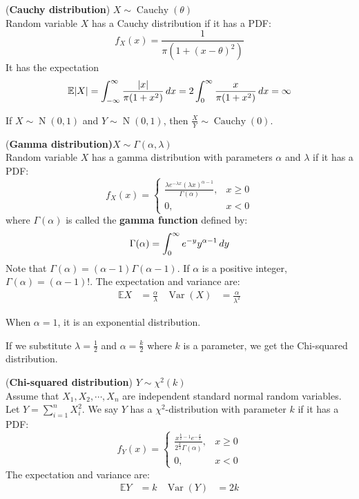 \documentclass{huhtakm-template-book}
\newcommand{\expect}{\mathbb{E}}
\DeclareMathOperator{\N}{N}
\DeclareMathOperator{\Cauchy}{Cauchy}
\DeclareMathOperator{\Var}{Var}
\begin{document}
\newpage
\begin{eg}(\textbf{Cauchy distribution}) $X\sim\Cauchy(\theta)$\\
	Random variable $X$ has a Cauchy distribution if it has a PDF:
	\begin{equation*}
		f_{X}(x)=\frac{1}{\pi(1+(x-\theta)^{2})}
	\end{equation*}
	It has the expectation
	\begin{equation*}
		\expect|X|=\intinfty\frac{|x|}{\pi(1+x^{2})}\,dx=2\intlu{0}{\infty}\frac{x}{\pi(1+x^{2})}\,dx=\infty
	\end{equation*}
\end{eg}
\begin{rem}
	If $X\sim\N(0,1)$ and $Y\sim\N(0,1)$, then $\frac{X}{Y}\sim\Cauchy(0)$.
\end{rem}
\begin{eg}(\textbf{Gamma distribution)}$X\sim\Gamma(\alpha,\lambda)$\\
	Random variable $X$ has a gamma distribution with parameters $\alpha$ and $\lambda$ if it has a PDF:
	\begin{equation*}
		f_{X}(x)=\begin{cases}
			\frac{\lambda e^{-\lambda x}(\lambda x)^{\alpha-1}}{\Gamma(\alpha)}, &x\geq 0\\
			0, &x<0
		\end{cases}
	\end{equation*}
	where $\Gamma(\alpha)$ is called the \textbf{gamma function} defined by:
	\begin{equation*}
		\Gamma(\alpha)=\int_{0}^{\infty}e^{-y}y^{\alpha-1}\,dy
	\end{equation*}
	Note that $\Gamma(\alpha)=(\alpha-1)\Gamma(\alpha-1)$. If $\alpha$ is a positive integer, $\Gamma(\alpha)=(\alpha-1)!$. The expectation and variance are:
	\begin{align*}
		\expect{X}&=\frac{\alpha}{\lambda} & \Var(X)&=\frac{\alpha}{\lambda^{2}}
	\end{align*}
\end{eg}
\begin{rem}
	When $\alpha=1$, it is an exponential distribution.
\end{rem}
If we substitute $\lambda=\frac{1}{2}$ and $\alpha=\frac{k}{2}$ where $k$ is a parameter, we get the Chi-squared distribution.
\begin{eg}(\textbf{Chi-squared distribution}) $Y\sim\chi^{2}(k)$\\
	Assume that $X_{1},X_{2},\cdots,X_{n}$ are independent standard normal random variables. Let $Y=\sum_{i=1}^{n}X_{i}^{2}$. We say $Y$ has a $\chi^{2}$-distribution with parameter $k$ if it has a PDF:
	\begin{equation*}
		f_{Y}(x)=\begin{cases}
			\frac{x^{\frac{k}{2}-1}e^{-\frac{x}{2}}}{2^{\frac{k}{2}}\Gamma(\alpha)}, &x\geq 0\\
			0, &x<0
		\end{cases}
	\end{equation*}
	The expectation and variance are:
	\begin{align*}
		\expect{Y}&=k & \Var(Y)&=2k
	\end{align*}
\end{eg}
\end{document}
